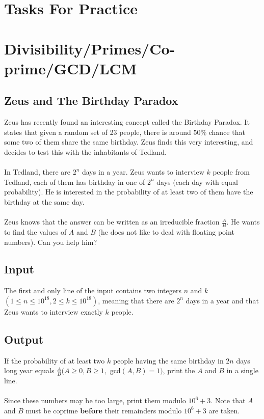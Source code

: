 \documentclass[10pt,a4paper]{article}
\begin{document}
\pagestyle{fancy}

\section*{Tasks For Practice}

\section{Divisibility/Primes/Co-prime/GCD/LCM}

\subsection*{Zeus and The Birthday Paradox}
Zeus has recently found an interesting concept called the Birthday Paradox. It states that given a random set of 23 people, there is around $50\%$ chance that some two of them share the same birthday. Zeus finds this very interesting, and decides to test this with the inhabitants of Tedland.
\\ \\
In Tedland, there are $2^n$ days in a year. Zeus wants to interview $k$ people from Tedland, each of them has birthday in one of $2^n$ days (each day with equal probability). He is interested in the probability of at least two of them have the birthday at the same day.
\\ \\
Zeus knows that the answer can be written as an irreducible fraction $\frac{A}{B}$. He wants to find the values of $A$ and $B$ (he does not like to deal with floating point numbers). Can you help him?

\subsection*{Input}
The first and only line of the input contains two integers $n$ and $k$ $(1 \leq n\leq 10^{18},2 \leq k\leq 10^{18})$, meaning that there are $2^n$ days in a year and that Zeus wants to interview exactly $k$ people.
\subsection*{Output}
If the probability of at least two $k$ people having the same birthday in $2n$ days long year equals $\frac{A}{B}(A \geq 0, B\geq1,$ gcd$(A,B)=1)$, print the $A$ and $B$ in a single line.
\\ \\
Since these numbers may be too large, print them modulo $10^6+3$. Note that $A$ and $B$ must be coprime \textbf{before} their remainders modulo $10^6+3$ are taken.
\end{document}
